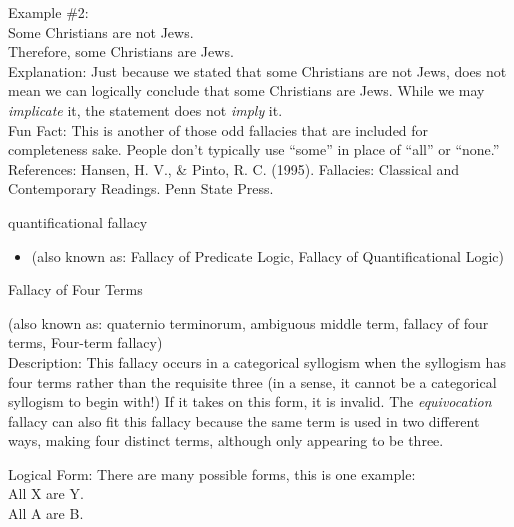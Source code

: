 \documentclass[a4paper,12pt,single,pdftex]{scrbook}
\begin{document}
    
      Example \#2:
    \\

    
      Some Christians are not Jews.
    \\

    
      Therefore, some Christians are Jews.
    \\

    
      Explanation: Just because we stated that some Christians are not  Jews, does not mean we can logically conclude that some Christians are Jews.  While we may {\it implicate} it, the statement does not {\it imply}  it.
    \\

    
      Fun Fact: This is another of those odd fallacies that are included for completeness sake. People don’t typically use “some” in place of “all” or “none.”
    \\

    References: Hansen, H. V., \& Pinto, R. C. (1995). Fallacies: Classical and Contemporary Readings. Penn State Press.
  

quantificational fallacy
    \begin{itemize}
  \item 
        (also known as: Fallacy of Predicate Logic, Fallacy of Quantificational Logic)
      
    \end{itemize}
  
  

Fallacy of Four Terms
    
      (also known as: quaternio terminorum, ambiguous middle term, fallacy of four terms, Four-term fallacy)
    \\

  
    Description: This fallacy occurs in a categorical syllogism when the syllogism has four terms rather than the requisite three (in a sense, it cannot be a categorical syllogism to begin with!)  If it takes on this form, it is invalid.  The {\it equivocation} fallacy can also fit this fallacy because the same term is used in two different ways, making four distinct terms, although only appearing to be three.

    
      Logical Form: There are many possible forms, this is one example:
    \\

    
      All X are Y.
    \\

    
      All A are B.
    \\
\end{document}
